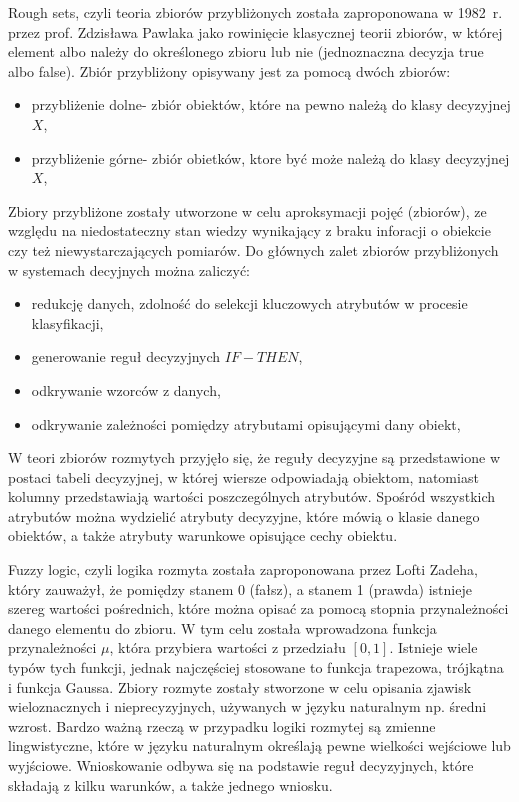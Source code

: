 Rough sets, czyli teoria zbiorów przybliżonych została zaproponowana w 1982~r.
przez prof. Zdzisława Pawlaka jako rowinięcie klasycznej teorii zbiorów, w
której element albo należy do określonego zbioru lub nie (jednoznaczna decyzja
true albo false). Zbiór przybliżony opisywany jest za pomocą dwóch zbiorów:
\begin{itemize}
    \item przybliżenie dolne- zbiór obiektów, które na pewno należą do klasy
        decyzyjnej $X$,
    \item przybliżenie górne- zbiór obietków, ktore być może należą do klasy
        decyzyjnej $X$,
\end{itemize}
Zbiory przybliżone zostały utworzone w celu aproksymacji pojęć (zbiorów), ze
względu na niedostateczny stan wiedzy wynikający z braku inforacji o
obiekcie czy też niewystarczających pomiarów. Do głównych zalet zbiorów
przybliżonych w systemach decyjnych można zaliczyć:
\begin{itemize}
    \item redukcję danych, zdolność do selekcji kluczowych atrybutów w procesie
        klasyfikacji,
    \item generowanie reguł decyzyjnych $IF-THEN$,
    \item odkrywanie wzorców z danych,
    \item odkrywanie zależności pomiędzy atrybutami opisującymi dany obiekt,
\end{itemize}
W teori zbiorów rozmytych przyjęło się, że reguły decyzyjne są przedstawione
w postaci tabeli decyzyjnej, w której wiersze odpowiadają obiektom, natomiast
kolumny przedstawiają wartości poszczególnych atrybutów. Spośród wszystkich
atrybutów można wydzielić atrybuty decyzyjne, które mówią o klasie danego
obiektów, a także atrybuty warunkowe opisujące cechy obiektu. 

Fuzzy logic, czyli logika rozmyta została zaproponowana przez Lofti Zadeha,
który zauważył, że pomiędzy stanem 0 (fałsz), a stanem 1 (prawda) istnieje
szereg wartości pośrednich, które można opisać za pomocą stopnia przynależności
danego elementu do zbioru. W tym celu została wprowadzona funkcja
przynależności $\mu$, która przybiera wartości z przedziału $[0,1]$. Istnieje wiele
typów tych funkcji, jednak najczęściej stosowane to funkcja trapezowa,
trójkątna i funkcja Gaussa. Zbiory rozmyte zostały stworzone w celu opisania
zjawisk wieloznacznych i nieprecyzyjnych, używanych w języku naturalnym np.
średni wzrost. Bardzo ważną rzeczą w przypadku logiki rozmytej są zmienne
lingwistyczne, które w języku naturalnym określają pewne wielkości wejściowe
lub wyjściowe. Wnioskowanie odbywa się na podstawie reguł decyzyjnych, które
składają z kilku warunków, a także jednego wniosku. 

